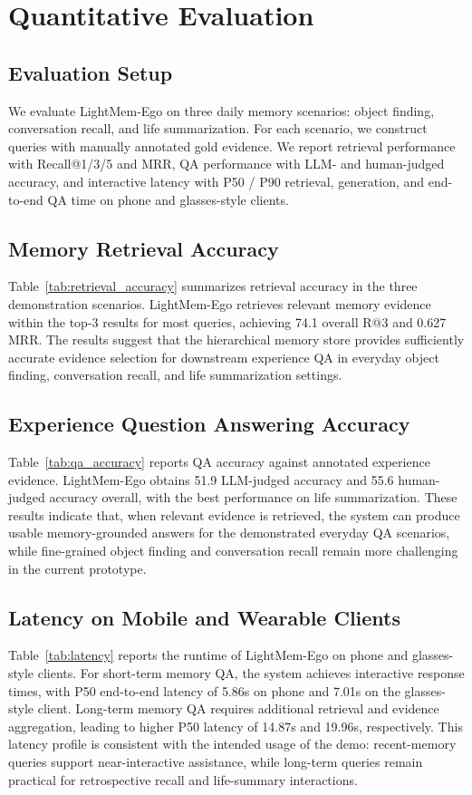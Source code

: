 \section{Quantitative Evaluation}

\subsection{Evaluation Setup}

We evaluate LightMem-Ego on three daily memory scenarios:
object finding, conversation recall, and life summarization. 
For each scenario, we construct queries with manually annotated gold
evidence. 
We report retrieval performance with Recall@1/3/5 and
MRR, QA performance with LLM- and human-judged accuracy, and
interactive latency with P50 / P90 retrieval, generation, and
end-to-end QA time on phone and glasses-style clients.


\subsection{Memory Retrieval Accuracy}
Table~\ref{tab:retrieval_accuracy} summarizes retrieval accuracy in the three demonstration scenarios. 
LightMem-Ego retrieves relevant memory evidence within the top-3 results for most queries, achieving 74.1 overall R@3 and 0.627 MRR. 
The results suggest that the hierarchical memory store provides sufficiently accurate evidence selection for downstream experience QA in everyday object finding, conversation recall, and life summarization settings.


\subsection{Experience Question Answering Accuracy}
Table~\ref{tab:qa_accuracy} reports QA accuracy against annotated
experience evidence. 
LightMem-Ego obtains 51.9 LLM-judged accuracy and 55.6 human-judged accuracy overall, with the best performance on life summarization.
These results indicate that, when relevant evidence is retrieved, the system can produce usable memory-grounded answers for the demonstrated everyday QA scenarios, while fine-grained object finding and conversation recall remain more challenging in the current prototype.


\subsection{Latency on Mobile and Wearable Clients}
Table~\ref{tab:latency} reports the runtime of LightMem-Ego on
phone and glasses-style clients. 
For short-term memory QA, the system achieves interactive response times, with P50 end-to-end latency of 5.86s on phone and 7.01s on the glasses-style client.
Long-term memory QA requires additional retrieval and evidence
aggregation, leading to higher P50 latency of 14.87s and 19.96s,
respectively. 
This latency profile is consistent with the intended usage of the demo: recent-memory queries support near-interactive assistance, while long-term queries remain practical for retrospective recall and life-summary interactions.

